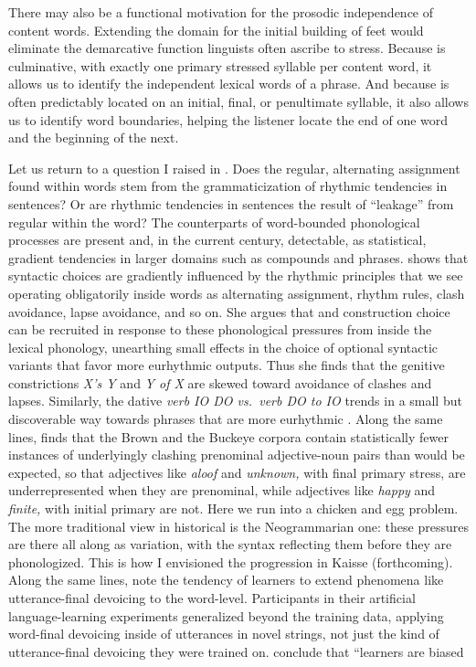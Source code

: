 \documentclass[output=paper,
modfonts
]{LSP/langsci}
\begin{document}
\begin{exe}
There may also be a functional motivation for the prosodic independence of content words. Extending the domain for the initial building of feet would eliminate the demarcative function linguists often ascribe to stress. Because  is culminative, with exactly one primary stressed syllable per content word, it allows us to identify the independent lexical words of a phrase. And because  is often predictably located on an initial, final, or penultimate syllable, it also allows us to identify word boundaries, helping the listener locate the end of one word and the beginning of the next. 

Let us return to a question I raised in . Does the regular, alternating  assignment found within words stem from the grammaticization of rhythmic tendencies in sentences? Or are rhythmic tendencies in sentences the result of “leakage” from regular  within the word? The counterparts of word-bounded phonological processes are present and, in the current century, detectable, as statistical, gradient tendencies in larger domains such as compounds and phrases. \citet{shih2016} shows that syntactic choices are gradiently influenced by the rhythmic principles that we see operating obligatorily inside words as alternating  assignment, rhythm rules,  clash avoidance, lapse avoidance, and so on. She argues that  and construction choice can be recruited in response to these phonological pressures from inside the lexical phonology, unearthing small effects in the choice of optional syntactic variants that favor more eurhythmic outputs. Thus she finds that the genitive constrictions \textit{X’s Y} and\textit{ Y of X} are skewed toward avoidance of  clashes and lapses. Similarly, the dative  \textit{verb IO DO vs.\ verb DO to IO} trends in a small but discoverable way towards phrases that are more eurhythmic \citep{anttila2010,shih2016}. Along the same lines, \citet{hammond2013} finds that the Brown and the Buckeye corpora contain statistically fewer instances of underlyingly clashing prenominal adjective-noun pairs than would be expected, so that adjectives like \textit{aloof} and \textit{unknown,} with final primary stress, are underrepresented when they are prenominal,\textit{} while adjectives like \textit{happy} and \textit{finite,} with initial primary  are not. Here we run into a chicken and egg problem. The more traditional view in historical  is the Neogrammarian one: these pressures are there all along as variation, with the syntax reflecting them before they are phonologized. This is how I envisioned the progression in Kaisse (forthcoming). Along the same lines, \citet{myers2015} note the tendency of learners to extend phenomena like utterance-final devoicing to the word-level. Participants in their artificial language-learning experiments generalized beyond the training data, applying word-final devoicing inside of utterances in novel strings, not just the kind of utterance-final devoicing they were trained on. \citet[399]{myers2015} conclude that “learners are biased 
\end{exe}
\end{document}
